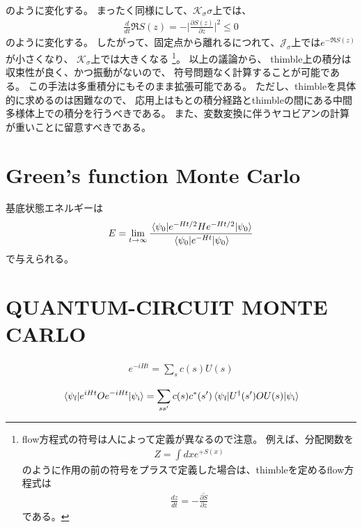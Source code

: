 \documentclass[]{ltjsarticle}
\newcommand{\del}{\partial}
\newcommand{\calJ}{\mathcal{J}}
\newcommand{\calK}{\mathcal{K}}
\begin{document}
のように変化する。
まったく同様にして、$\calK_\sigma\sigma$上では、
\begin{align}
	\frac{d}{dt} \Re S(z)
	=-\Bigg| \frac{\del S(z)}{\del z} \Bigg|^2 \leq 0
\end{align}
のように変化する。
したがって、固定点から離れるにつれて、$\calJ_\sigma$上では$e^{-\Re S(z)}$が小さくなり、
$\calK_\sigma$上では大きくなる
\footnote{
	flow方程式の符号は人によって定義が異なるので注意。
	例えば、分配関数を
	\begin{align}
		Z = \int dx e^{+S(x)}
	\end{align}
	のように作用の前の符号をプラスで定義した場合は、thimbleを定めるflow方程式は
	\begin{align}
		\frac{d z}{d t} = -\overline{\frac{\del S}{\del z}}
	\end{align}
	である。
}。
以上の議論から、
thimble上の積分は収束性が良く、かつ振動がないので、
符号問題なく計算することが可能である。
この手法は多重積分にもそのまま拡張可能である。
ただし、thimbleを具体的に求めるのは困難なので、
応用上はもとの積分経路とthimbleの間にある中間多様体上での積分を行うべきである。
また、変数変換に伴うヤコビアンの計算が重いことに留意すべきである。



\section{Green's function Monte Carlo}
基底状態エネルギーは
\begin{align}
    E = \lim_{t\to \infty} 
    \frac{\ev{e^{-Ht/2}He^{-Ht/2}}{\psi_0}}{\ev{e^{-Ht}}{\psi_0}}
\end{align}    
で与えられる。



\section{QUANTUM-CIRCUIT MONTE CARLO}
\begin{align}
    e^{-iHt} = \sum_{s} c(s) U(s)
\end{align}   

\begin{align}
    \mel{\psi_\text{f}}{e^{iHt}Oe^{-iHt}}{\psi_\text{i}}
    =
    \sum_{ss'} c(s) c^*(s')
    \mel{\psi_\text{f}}{U^\dagger(s') O U(s)}{\psi_\text{i}}
\end{align}   




%
%
\end{document}
